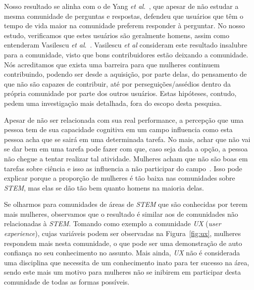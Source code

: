 Nosso resultado se alinha com o de Yang \textit{et al}.~\cite{yang2010activity}, que apesar de não estudar a mesma comunidade de perguntas e respostas, defendeu que usuários que têm o tempo de vida maior na comunidade preferem responder à perguntar. No nosso estudo, verificamos que estes usuários são geralmente homens, assim como entenderam Vasilescu \textit{et al}.~\cite{Vasilescu27092013}. Vasilescu \textit{et al} consideram este resultado insalubre para a comunidade, visto que bons contribuidores estão deixando a comunidade. Nós acreditamos que exista uma barreira para que mulheres continuem contribuindo, podendo ser desde a aquisição, por parte delas, do pensamento de que não são capazes de contribuir, até por perseguições/assédios dentro da própria comunidade por parte dos outros usuários. Estas hipóteses, contudo, pedem uma investigação mais detalhada, fora do escopo desta pesquisa.

Apesar de não ser relacionada com sua real performance, a percepção que uma pessoa tem de sua capacidade cognitiva em um campo influencia como esta pessoa acha que se sairá em uma determinada tarefa. No mais, achar que não vai se dar bem em uma tarefa pode fazer com que, caso seja dada a opção, a pessoa não chegue a tentar realizar tal atividade. Mulheres acham que não são boas em tarefas sobre ciência e isso as influencia a não participar do campo~\cite{ehrlinger2003chronic}. Isso pode explicar porque a proporção de mulheres é tão baixa nas comunidades sobre \emph{STEM}, mas elas se dão tão bem quanto homens na maioria delas.


Se olharmos para comunidades de áreas de \emph{STEM} que são conhecidas por terem mais mulheres, observamos que o resultado é similar aos de comunidades não relacionadas à \emph{STEM}. Tomando como exemplo a comunidade \emph{UX} (\textit{user experience}), cujas variáveis podem ser observadas na Figura~\ref{fig:ux}, mulheres respondem mais nesta comunidade, o que pode ser uma demonstração de auto confiança no seu conhecimento no assunto. Mais ainda, \emph{UX} não é considerada uma disciplina que necessita de um conhecimento inato para ter sucesso na área, sendo este mais um motivo para mulheres não se inibirem em participar desta comunidade de todas as formas possíveis. 

